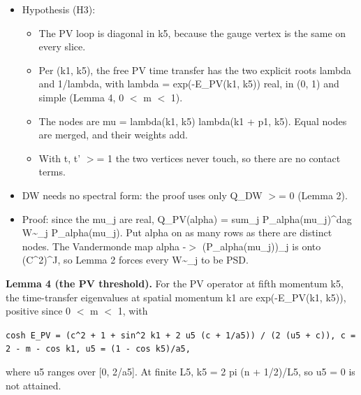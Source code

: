 \documentclass[11pt,a4paper]{article}
\begin{document}
\begin{itemize}
\item{} Hypothesis (H3):
\begin{itemize}
\item{} The PV loop is diagonal in k5, because the gauge vertex is the same on every slice.
\item{} Per (k1, k5), the free PV time transfer has the two explicit roots lambda and 1/lambda, with
lambda = exp(-E\_PV(k1, k5)) real, in (0, 1) and simple (Lemma 4, 0 $<$ m $<$ 1).
\item{} The nodes are mu = lambda(k1, k5) lambda(k1 + p1, k5). Equal nodes are merged, and their weights add.
\item{} With t, t' $>$= 1 the two vertices never touch, so there are no contact terms.
\end{itemize}

\item{} DW needs no spectral form: the proof uses only Q\_DW $>$= 0 (Lemma 2).
\item{} Proof: since the mu\_j are real, Q\_PV(alpha) = sum\_j P\_alpha(mu\_j)\textasciicircum{}dag W\textasciitilde{}\_j P\_alpha(mu\_j). Put alpha on as many rows
as there are distinct nodes. The Vandermonde map alpha -$>$ (P\_alpha(mu\_j))\_j is onto (C\textasciicircum{}2)\textasciicircum{}J, so Lemma 2 forces
every W\textasciitilde{}\_j to be PSD.
\end{itemize}

{\bfseries\boldmath Lemma 4 (the PV threshold).} For the PV operator at fifth momentum k5, the time-transfer eigenvalues at spatial
momentum k1 are exp(-E\_PV(k1, k5)), positive since 0 $<$ m $<$ 1, with

\texttt{cosh E\_PV = (c\textasciicircum{}2 + 1 + sin\textasciicircum{}2 k1 + 2 u5 (c + 1/a5)) / (2 (u5 + c)),   c = 2 - m - cos k1,  u5 = (1 - cos k5)/a5,}

where u5 ranges over [0, 2/a5]. At finite L5, k5 = 2 pi (n + 1/2)/L5, so u5 = 0 is not attained.
\end{document}
